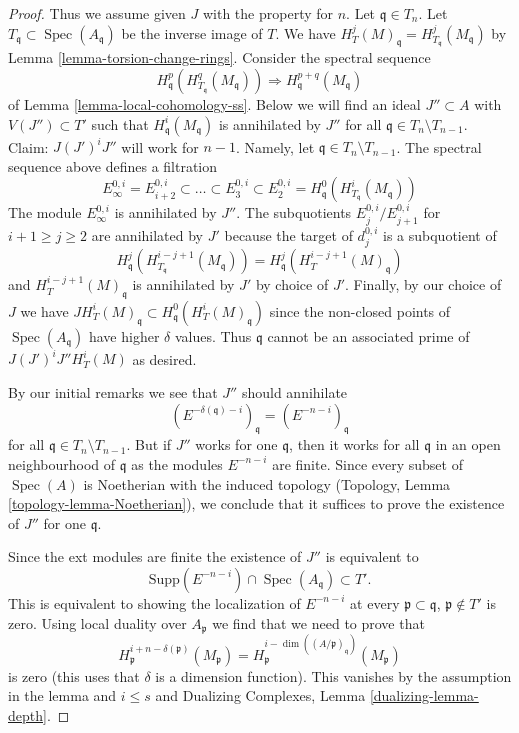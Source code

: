 \documentclass{stacks-project}
\theoremstyle{plain}
\theoremstyle{definition}
\theoremstyle{remark}
\numberwithin{equation}{subsection}
\def\Spec{\mathop{\mathrm{Spec}}}
\begin{document}
\begin{proof}
\medskip\noindent
Thus we assume given $J$ with the property for $n$.
Let $\mathfrak q \in T_n$. Let $T_\mathfrak q \subset \Spec(A_\mathfrak q)$
be the inverse image of $T$. We have
$H^j_T(M)_\mathfrak q = H^j_{T_\mathfrak q}(M_\mathfrak q)$
by Lemma \ref{lemma-torsion-change-rings}.
Consider the spectral sequence
$$
H_\mathfrak q^p(H^q_{T_\mathfrak q}(M_\mathfrak q))
\Rightarrow
H^{p + q}_\mathfrak q(M_\mathfrak q)
$$
of Lemma \ref{lemma-local-cohomology-ss}.
Below we will find an ideal $J'' \subset A$ with $V(J'') \subset T'$
such that $H^i_\mathfrak q(M_\mathfrak q)$ is annihilated by $J''$ for all
$\mathfrak q \in T_n \setminus T_{n - 1}$.
Claim: $J (J')^i J''$ will work for $n - 1$.
Namely, let $\mathfrak q \in T_n \setminus T_{n - 1}$.
The spectral sequence above defines a filtration
$$
E_\infty^{0, i} = E_{i + 2}^{0, i} \subset \ldots \subset E_3^{0, i} \subset
E_2^{0, i} = H^0_\mathfrak q(H^i_{T_\mathfrak q}(M_\mathfrak q))
$$
The module $E_\infty^{0, i}$ is annihilated by $J''$.
The subquotients $E_j^{0, i}/E_{j + 1}^{0, i}$ for $i + 1 \geq j \geq 2$
are annihilated by $J'$ because the target of $d_j^{0, i}$
is a subquotient of
$$
H^j_\mathfrak q(H^{i - j + 1}_{T_\mathfrak q}(M_\mathfrak q)) =
H^j_\mathfrak q(H^{i - j + 1}_T(M)_\mathfrak q)
$$
and $H^{i - j + 1}_T(M)_\mathfrak q$ is annihilated by $J'$ by choice of $J'$.
Finally, by our choice of $J$ we have
$J H^i_T(M)_\mathfrak q \subset H^0_\mathfrak q(H^i_T(M)_\mathfrak q)$
since the non-closed points of $\Spec(A_\mathfrak q)$ have higher
$\delta$ values. Thus $\mathfrak q$ cannot be an associated prime of
$J(J')^iJ'' H^i_T(M)$ as desired.

\medskip\noindent
By our initial remarks we see that $J''$ should annihilate
$$
(E^{-\delta(\mathfrak q) - i})_\mathfrak q =
(E^{-n - i})_\mathfrak q
$$
for all $\mathfrak q \in T_n \setminus T_{n - 1}$.
But if $J''$ works for one $\mathfrak q$, then it works for all
$\mathfrak q$ in an open neighbourhood of $\mathfrak q$
as the modules $E^{-n - i}$ are finite.
Since every subset of $\Spec(A)$ is Noetherian with the induced
topology (Topology, Lemma \ref{topology-lemma-Noetherian}),
we conclude that it suffices
to prove the existence of $J''$ for one $\mathfrak q$.

\medskip\noindent
Since the ext modules are finite the existence of $J''$ is
equivalent to
$$
\text{Supp}(E^{-n - i}) \cap \Spec(A_\mathfrak q) \subset T'.
$$
This is equivalent to showing the localization of $E^{-n - i}$ at every
$\mathfrak p \subset \mathfrak q$, $\mathfrak p \not \in T'$
is zero. Using local duality over $A_\mathfrak p$ we find that we need
to prove that
$$
H^{i + n - \delta(\mathfrak p)}_\mathfrak p(M_\mathfrak p) =
H^{i - \dim((A/\mathfrak p)_\mathfrak q)}_\mathfrak p(M_\mathfrak p)
$$
is zero (this uses that $\delta$ is a dimension function).
This vanishes by the assumption in the lemma and $i \leq s$ and
Dualizing Complexes, Lemma \ref{dualizing-lemma-depth}.


\end{proof}
\end{document}

